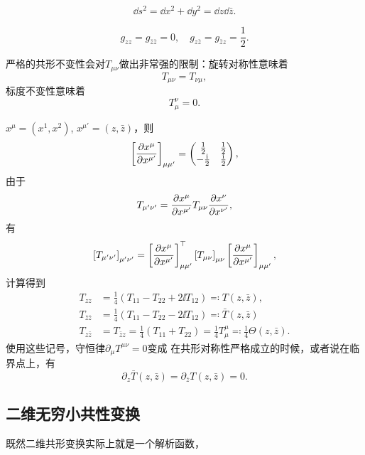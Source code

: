 \begin{equation}
    \dd{s^2} = \dd{x^2} + \dd{y^2} = \dd{z} \dd{\bar{z}}.
\end{equation}

\begin{equation}
    g_{zz} = g_{\bar{z} \bar{z}} = 0, \quad g_{z \bar{z}} = g_{\bar{z} z} = \frac{1}{2}.
\end{equation}

严格的共形不变性会对$T_{\mu \nu}$做出非常强的限制：旋转对称性意味着
\begin{equation}
    T_{\mu \nu} = T_{\nu \mu},
\end{equation}
标度不变性意味着
\begin{equation}
    T_{\mu}^\nu = 0.
\end{equation}

$x^\mu = (x^1, x^2)$, $x^{\mu'} = (z, \bar{z})$，则
\[
    \left[\pdv{x^\mu}{x^{\mu'}}\right]_{\mu \mu'} = \pmqty{\frac{1}{2} & \frac{1}{2} \\ - \frac{\ii}{2} & \frac{\ii}{2}},
\]
由于
\[
    T_{\mu' \nu'} = \pdv{x^\mu}{x^{\mu'}} T_{\mu \nu} \pdv{x^\nu}{x^{\nu'}},
\]
有
\[
    \left[T_{\mu' \nu'}\right]_{\mu' \nu'} = \left[\pdv{x^\mu}{x^{\mu'}}\right]_{\mu \mu'}^\top \left[T_{\mu \nu}\right]_{\mu \nu} \left[\pdv{x^\mu}{x^{\mu'}}\right]_{\mu \mu'},
\]
计算得到
\begin{equation}
    \begin{aligned}
        T_{zz} &= \frac{1}{4} (T_{11} - T_{22} + 2\ii T_{12}) \eqqcolon T(z, \bar{z}) , \\
        T_{\bar{z} \bar{z}} &= \frac{1}{4} (T_{11} - T_{22} - 2\ii T_{12}) \eqqcolon \bar{T}(z, \bar{z}) \\
        T_{z \bar{z}} &= T_{\bar{z} z} = \frac{1}{4} (T_{11} + T_{22}) = \frac{1}{4} T_\mu^\mu \eqqcolon \frac{1}{4} \Theta(z, \bar{z}).
    \end{aligned}
\end{equation}
使用这些记号，守恒律$\partial_\mu T^{\mu \nu} = 0$变成
在共形对称性严格成立的时候，或者说在临界点上，有
\begin{equation}
    \partial_z \bar{T}(z, \bar{z}) = \partial_{\bar{z}} T(z, \bar{z}) = 0.
\end{equation}

\subsection{二维无穷小共性变换}

既然二维共形变换实际上就是一个解析函数，

